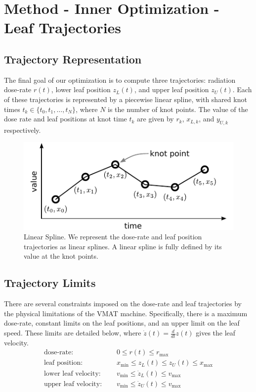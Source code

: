 \section{Method - Inner Optimization - Leaf Trajectories}


\subsection{Trajectory Representation}

The final goal of our optimization is to compute three trajectories:
radiation dose-rate $r(t)$, lower leaf position $z_L(t)$, and upper leaf position $z_U(t)$.
Each of these trajectories is represented by a piecewise linear spline,
with shared knot times $t_k \in \{t_0, t_1, \dots, t_N\}$, where $N$ is the number of knot points.
The value of the dose rate and leaf positions at knot time $t_k$ are given by
$r_k$, $x_{L,k}$, and $y_{U,k}$ respectively.

\begin{figure}
  \centering
  \includegraphics{fig/linearSpline.pdf}
  \caption{Linear Spline. We represent the dose-rate and leaf position trajectories as linear
           splines. A linear spline is fully defined by its value at the knot points. }
  \label{fig:linearSpline}
\end{figure}

\subsection{Trajectory Limits}

There are several constraints imposed on the dose-rate and leaf trajectories
by the physical limitations of the VMAT machine. Specifically, there is a maximum dose-rate,
constant limits on the leaf positions, and an upper limit on the leaf speed.
These limits are detailed below, where $\dot{z}(t) = \tfrac{d}{dt}z(t)$ gives the leaf velocity.
\begin{align}
  \text{dose-rate: }& \quad 0 \leq r(t) \leq r_\text{max}
      \label{eqn:FirstTrajectoryConstraint}\\
  \text{leaf position: }& \quad x_\text{min} \leq z_L(t) \leq z_U(t) \leq x_\text{max} \\
  \text{lower leaf velocity: }& \quad v_\text{min} \leq \dot{z}_L(t) \leq v_\text{max} \\
  \text{upper leaf velocity: }& \quad v_\text{min} \leq \dot{z}_U(t) \leq v_\text{max}
      \label{eqn:LastTrajectoryConstraint}
\end{align}

